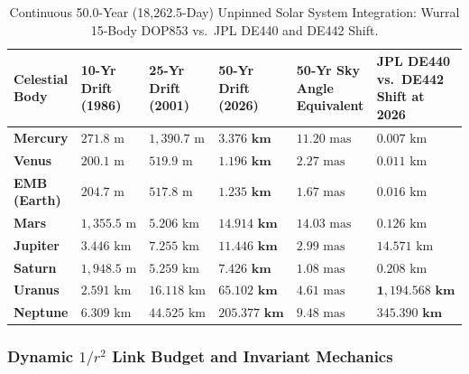 \documentclass[11pt,a4paper]{article}
\begin{document}
\begin{table}[!htbp]
\centering
\caption{Continuous 50.0-Year (18,262.5-Day) Unpinned Solar System Integration: Wurral 15-Body DOP853 vs.~JPL DE440 and DE442 Shift.}
\label{tab:wurral_50yr_unpinned}
\footnotesize
\setlength{\tabcolsep}{4pt}
\renewcommand{\arraystretch}{1.18}
\begin{tabularx}{\textwidth}{L{2.3cm} Z Z Z Z C{2.8cm}}
\toprule
\textbf{Celestial Body} & \textbf{10-Yr Drift (1986)} & \textbf{25-Yr Drift (2001)} & \textbf{50-Yr Drift (2026)} & \textbf{50-Yr Sky Angle Equivalent} & \textbf{JPL DE440 vs.~DE442 Shift at 2026} \\
\midrule
\textbf{Mercury} & $271.8\text{ m}$ & $1{,}390.7\text{ m}$ & $\mathbf{3.376\text{ km}}$ & $11.20\text{ mas}$ & $0.007\text{ km}$ \\
\textbf{Venus}   & $200.1\text{ m}$ & $519.9\text{ m}$   & $\mathbf{1.196\text{ km}}$ & $2.27\text{ mas}$  & $0.011\text{ km}$ \\
\textbf{EMB (Earth)} & $204.7\text{ m}$ & $517.8\text{ m}$ & $\mathbf{1.235\text{ km}}$ & $1.67\text{ mas}$  & $0.016\text{ km}$ \\
\textbf{Mars}    & $1{,}355.5\text{ m}$ & $5.206\text{ km}$ & $\mathbf{14.914\text{ km}}$ & $14.03\text{ mas}$ & $0.126\text{ km}$ \\
\textbf{Jupiter} & $3.446\text{ km}$ & $7.255\text{ km}$  & $\mathbf{11.446\text{ km}}$ & $2.99\text{ mas}$  & $14.571\text{ km}$ \\
\textbf{Saturn}  & $1{,}948.5\text{ m}$ & $5.259\text{ km}$ & $\mathbf{7.426\text{ km}}$  & $1.08\text{ mas}$  & $0.208\text{ km}$ \\
\textbf{Uranus}  & $2.591\text{ km}$ & $16.118\text{ km}$ & $\mathbf{65.102\text{ km}}$ & $4.61\text{ mas}$  & $\mathbf{1{,}194.568\text{ km}}$ \\
\textbf{Neptune} & $6.309\text{ km}$ & $44.525\text{ km}$ & $\mathbf{205.377\text{ km}}$ & $9.48\text{ mas}$ & $\mathbf{345.390\text{ km}}$ \\
\bottomrule
\end{tabularx}
\end{table}

\subsubsection{Dynamic $1/r^2$ Link Budget and Invariant Mechanics}
\label{subsubsec:link_budget}
\end{document}
